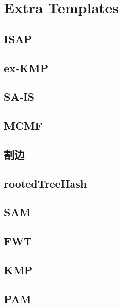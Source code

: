 \chapter{Extra Templates}
\section{ISAP}

\section{ex-KMP}

\section{SA-IS}

\section{MCMF}

\section{割边}

\section{rootedTreeHash}

\section{SAM}

\section{FWT}

\section{KMP}

\section{PAM}

